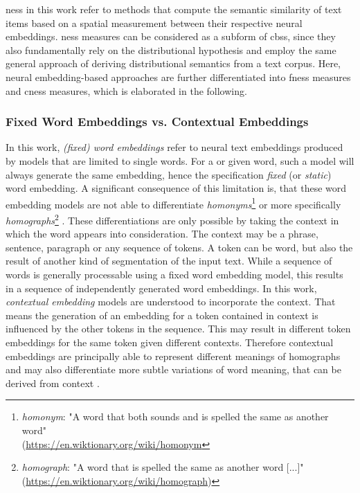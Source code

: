 \documentclass[11pt, numbers=noenddot]{scrreprt}
\let\cite\parencite  %
\begin{document}
\gls{ness} in this work refer to methods that compute the semantic similarity of text items based on a spatial measurement between their respective neural embeddings. \gls{ness} measures can be considered as a subform of \gls{cbss}, since they also fundamentally rely on the distributional hypothesis and employ the same general approach of deriving distributional semantics from a text corpus. Here, neural embedding-based approaches are further differentiated into \gls{fness} measures and \gls{cness} measures, which is elaborated in the following. 


\subsubsection{Fixed Word Embeddings vs. Contextual Embeddings}
\label{sec:fixed-word-vs-contextual-embeddings}
In this work, \textit{(fixed) word embeddings} refer to neural text embeddings produced by models  that are limited to single words. For a or given word, such a model will always generate the same embedding, hence the specification \textit{fixed} (or \textit{static}) word embedding. A significant consequence of this limitation is, that these word embedding models are not able to differentiate \textit{homonyms}\footnote{\textit{homonym}: "A word that both sounds and is spelled the same as another word"\\(\url{https://en.wiktionary.org/wiki/homonym}} or more specifically \textit{homographs}\footnote{\textit{homograph}: "A word that is spelled the same as another word [...]"\\(\url{https://en.wiktionary.org/wiki/homograph})} \cite{liWordEmbeddingUnderstanding2018}. These differentiations are only possible by taking the context in which the word appears into consideration. The context may be a phrase, sentence, paragraph or any sequence of tokens. A token can be word, but also the result of another kind of segmentation of the input text. While a sequence of words is generally processable using a fixed word embedding model, this results in a sequence of independently generated word embeddings. In this work, \textit{contextual embedding} models are understood to incorporate the context. That means the generation of an embedding for a token contained in context is influenced by the other tokens in the sequence. This may result in different token embeddings for the same token given different contexts. Therefore contextual embeddings are principally able to represent different meanings of homographs and may also differentiate more subtle variations of word meaning, that can be derived from context \cite{liuSurveyContextualEmbeddings2020}.
\end{document}
